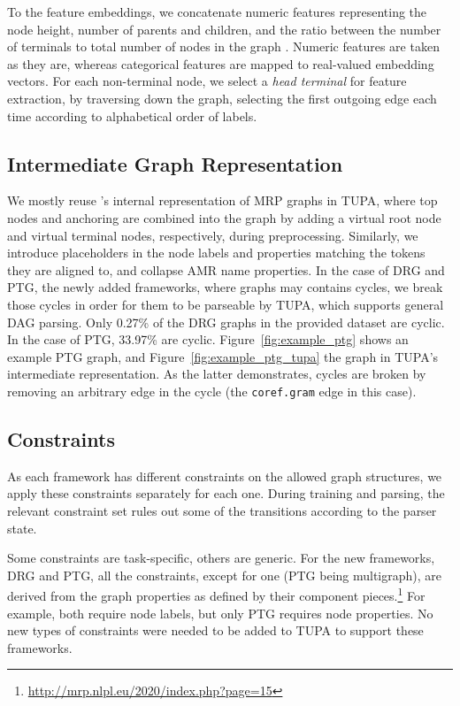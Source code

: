 \documentclass[11pt,a4paper]{article}
\begin{document}
To the feature embeddings, we concatenate numeric features representing the node height, number of parents and children, and the ratio between the number of terminals to total number of nodes in the graph  \cite{hershcovich2017a}. Numeric features are taken as they are, whereas categorical features are mapped to real-valued embedding vectors. For each non-terminal node, we select a \textit{head terminal} for feature extraction, by traversing down the graph, selecting the first outgoing edge each time according to alphabetical order of labels.

\subsection{Intermediate Graph Representation}\label{sec:tupa-format}

We mostly reuse 's
internal representation of MRP graphs in TUPA,
where top nodes and anchoring are combined into the graph by adding a virtual root node
and virtual terminal nodes, respectively, during preprocessing.
Similarly, we introduce placeholders in the node labels and properties matching the tokens they are aligned to,
and collapse AMR name properties.
In the case of DRG and PTG, the newly added frameworks, where graphs may contains cycles, we break those cycles in order for them to be parseable by TUPA, which supports general DAG parsing. Only 0.27\% of the DRG graphs in the provided dataset are cyclic. In the case of PTG, 33.97\% are cyclic.
Figure~\ref{fig:example_ptg} shows an example PTG graph, and Figure~\ref{fig:example_ptg_tupa} the graph in TUPA's intermediate representation.
As the latter demonstrates, cycles are broken by removing an arbitrary edge in the cycle (the \texttt{coref.gram} edge in this case).




\subsection{Constraints}\label{sec:tupa-constraints}

As each framework has different constraints on the allowed graph structures,
we apply these constraints separately for each one.
During training and parsing, the relevant constraint set rules out some of the transitions
according to the parser state.

Some constraints are task-specific, others are generic.
For the new frameworks, DRG and PTG, all the constraints, except for one (PTG being multigraph), are derived from the graph properties as defined by their component pieces.\footnote{\url{http://mrp.nlpl.eu/2020/index.php?page=15}} For example, both require node labels, but only PTG requires node properties. No new types of constraints were needed to be added to TUPA to support these frameworks.
 
\end{document}
